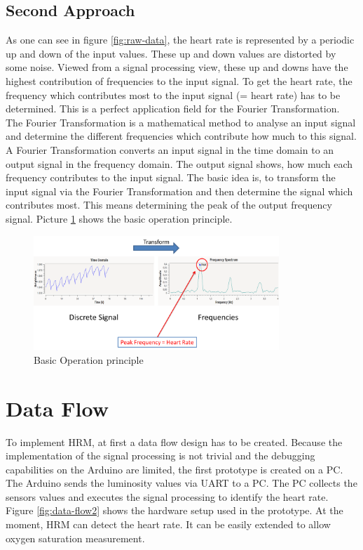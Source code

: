 \documentclass[notitlepage]{scrreprt}
\begin{document}
\subsection{Second Approach}
As one can see in figure \ref{fig:raw-data}, the heart rate is represented by a periodic up and down of the input values. These up and down values are distorted by some noise. Viewed from a signal processing view, these up and downs have the highest contribution of frequencies to the input signal. To get the heart rate, the frequency which contributes most to the input signal (= heart rate) has to be determined. This is a perfect application field for the Fourier Transformation. The Fourier Transformation is a mathematical method to analyse an input signal and determine the different frequencies which contribute how much to this signal. A Fourier Transformation converts an input signal in the time domain to an output signal in the frequency domain. The output signal shows, how much each frequency contributes to the input signal. The basic idea is, to transform the input signal via the Fourier Transformation and then determine the signal which contributes most. This means determining the peak of the output frequency signal. Picture \ref{fig:basic-operation} shows the basic operation principle.

\begin{figure}[H]
	\centering
	\includegraphics[width=350px]{images/basicOperation.png}
	\caption{Basic Operation principle}
	\label{fig:basic-operation}
\end{figure}

\section{Data Flow}
To implement HRM, at first a data flow design has to be created. Because the implementation of the signal processing is not trivial and the debugging capabilities on the Arduino are limited, the first prototype is created on a PC. The Arduino sends the luminosity values via UART to a PC. The PC collects the sensors values and executes the signal processing to identify the heart rate. Figure \ref{fig:data-flow2} shows the hardware setup used in the prototype. At the moment, HRM can detect the heart rate. It can be easily extended to allow oxygen saturation measurement.
\end{document}
